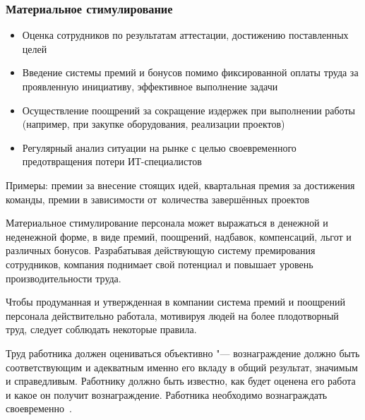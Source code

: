 \documentclass{../industrial-development}
\begin{document}

\begin{frame} \frametitle{Материальное стимулирование}

	 \begin{itemize}
	\item Оценка сотрудников по результатам аттестации, достижению поставленных целей
	\item Введение системы премий и бонусов помимо фиксированной оплаты труда за проявленную инициативу, эффективное выполнение задачи
	\item  Осуществление поощрений за сокращение издержек при выполнении работы (например, при закупке оборудования, реализации проектов)
		 \item  Регулярный анализ ситуации на рынке с целью своевременного предотвращения потери ИТ-специалистов
			  \end{itemize}
		Примеры: премии за внесение стоящих идей, квартальная премия за достижения команды, премии в зависимости от~количества завершённых проектов
		
				\end{frame}

\lecturenotes

Материальное стимулирование персонала может выражаться в денежной и неденежной форме, в виде премий, поощрений, надбавок, компенсаций, льгот и различных бонусов. Разрабатывая действующую систему премирования сотрудников, компания поднимает свой потенциал и повышает уровень производительности труда.

Чтобы продуманная и утвержденная в компании система премий и поощрений персонала действительно работала, мотивируя людей на более плодотворный труд, следует соблюдать некоторые правила.

Труд работника должен оцениваться объективно "--- вознаграждение должно быть соответствующим и адекватным именно его вкладу в общий результат, значимым и справедливым. Работнику должно быть известно, как будет оценена его работа и какое он получит вознаграждение. Работника необходимо вознаграждать своевременно~\cite{MotivPerson}.

\end{document}
